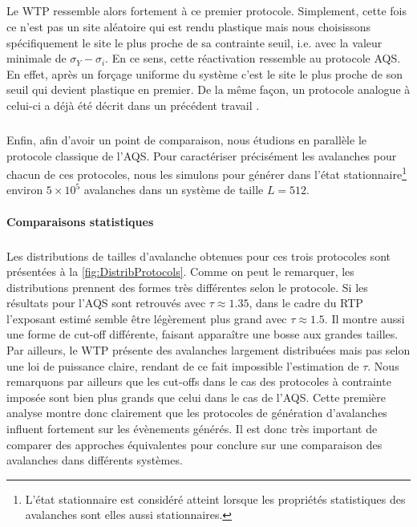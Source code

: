 \subparagraph{}Le WTP ressemble alors fortement à ce premier protocole. Simplement, cette fois ce n'est pas un site aléatoire qui est rendu plastique mais nous choisissons spécifiquement le site le plus proche de sa contrainte seuil, i.e. avec la valeur minimale de $\sigma_Y - \sigma_i$. En ce sens, cette réactivation ressemble au protocole AQS. En effet, après un forçage uniforme du système c'est le site le plus proche de son seuil qui devient plastique en premier. De la même façon, un protocole analogue à celui-ci a déjà été décrit dans un précédent travail \cite{lin_scaling_2014}.

\subparagraph{}Enfin, afin d'avoir un point de comparaison, nous étudions en parallèle le protocole classique de l'AQS. Pour caractériser précisément les avalanches pour chacun de ces protocoles, nous les simulons pour générer dans l'état stationnaire\footnote{L'état stationnaire est considéré atteint lorsque les propriétés statistiques des avalanches sont elles aussi stationnaires.} environ $5\times 10^5$ avalanches dans un système de taille $L=512$.

\paragraph{Comparaisons statistiques}

\subparagraph{}Les distributions de tailles d'avalanche obtenues pour ces trois protocoles sont présentées à la \autoref{fig:DistribProtocols}. Comme on peut le remarquer, les distributions prennent des formes très différentes selon le protocole. Si les résultats pour l'AQS sont retrouvés avec $\tau\approx 1.35$, dans le cadre du RTP l'exposant estimé semble être légèrement plus grand avec $\tau \approx 1.5$. Il montre aussi une forme de cut-off différente, faisant apparaître une bosse aux grandes tailles. Par ailleurs, le WTP présente des avalanches largement distribuées mais pas selon une loi de puissance claire, rendant de ce fait impossible l'estimation de $\tau$. Nous remarquons par ailleurs que les cut-offs dans le cas des protocoles à contrainte imposée sont bien plus grands que celui dans le cas de l'AQS. Cette première analyse montre donc clairement que les protocoles de génération d'avalanches influent fortement sur les évènements générés. Il est donc très important de comparer des approches équivalentes pour conclure sur une comparaison des avalanches dans différents systèmes.

